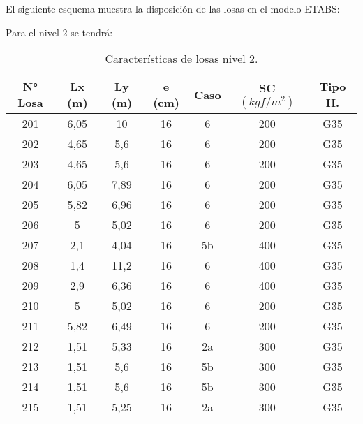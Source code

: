 \newpage

El siguiente esquema muestra la disposición de las losas en el modelo ETABS:

\newpage

Para el nivel 2 se tendrá:

\begin{table}[H]
  \centering
  \caption{Características de losas nivel 2.}
  \begin{tabular}{ccccccc}
    \hline
    \textbf{N° Losa} &      \textbf{Lx (m)} &      \textbf{Ly (m)} &      \textbf{e (cm)} &      \textbf{Caso} &      \textbf{SC $(kgf/m^2)$} &      \textbf{Tipo H.}      \bigstrut\\
    \hline
    201 &      6,05 &      10 &      16 &      6 &      200 &      G35      \bigstrut[t]\\
    202 &      4,65 &      5,6 &      16 &      6 &      200 &      G35      \\
    203 &      4,65 &      5,6 &      16 &      6 &      200 &      G35      \\
    204 &      6,05 &      7,89 &      16 &      6 &      200 &      G35      \\
    205 &      5,82 &      6,96 &      16 &      6 &      200 &      G35      \\
    206 &      5 &      5,02 &      16 &      6 &      200 &      G35      \\
    207 &      2,1 &      4,04 &      16 &      5b &      400 &      G35      \\
    208 &      1,4 &      11,2 &      16 &      6 &      400 &      G35      \\
    209 &      2,9 &      6,36 &      16 &      6 &      400 &      G35      \\
    210 &      5 &      5,02 &      16 &      6 &      200 &      G35      \\
    211 &      5,82 &      6,49 &      16 &      6 &      200 &      G35      \\
    212 &      1,51 &      5,33 &      16 &      2a &      300 &      G35      \\
    213 &      1,51 &      5,6 &      16 &      5b &      300 &      G35      \\
    214 &      1,51 &      5,6 &      16 &      5b &      300 &      G35      \\
    215 &      1,51 &      5,25 &      16 &      2a &      300 &      G35      \\

\end{tabular}
\end{table}
